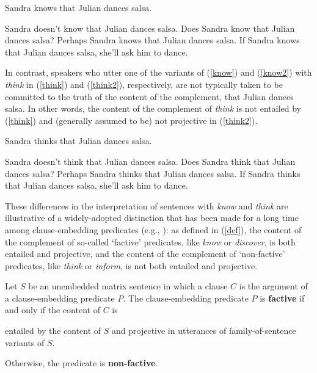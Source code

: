 \documentclass[11pt,fleqn]{article}
\newcommand{\6}{\mbox{$[\hspace*{-.6mm}[$}}
\newcommand{\9}{\mbox{$]\hspace*{-.6mm}]$}}
\begin{document}
\begin{exe}

\ex\label{know} Sandra knows that Julian dances salsa.

\ex\label{know2} 

\begin{xlist} 
\ex Sandra doesn't know that Julian dances salsa. 
\ex Does Sandra know that Julian dances salsa?
\ex Perhaps Sandra knows that Julian dances salsa.
\ex If Sandra knows that Julian dances salsa, she'll ask him to dance. 
\end{xlist}

\end{exe}

In contrast, speakers who utter one of the variants of (\ref{know}) and (\ref{know2}) with {\em think} in (\ref{think}) and (\ref{think2}), respectively, are not typically taken to be committed to the truth of the content of the complement, that Julian dances salsa. In other words, the content of the complement of {\em think} is not entailed by (\ref{think}) and (generally assumed to be) not projective in (\ref{think2}).

\begin{exe}

\ex\label{think} Sandra thinks that Julian dances salsa.
\ex\label{think2} 

\begin{xlist} 
\ex Sandra doesn't think that Julian dances salsa. 
\ex Does Sandra think that Julian dances salsa?
\ex Perhaps Sandra thinks that Julian dances salsa.
\ex If Sandra thinks that Julian dances salsa, she'll ask him to dance. 
\end{xlist}

\end{exe}

These differences in the interpretation of sentences with {\em know} and {\em think} are illustrative of a widely-adopted distinction that has been made for a long time among clause-embedding predicates (e.g., \citealt{karttunen71b,kiparsky-kiparsky71}): as defined in (\ref{def}), the content of the complement of so-called `factive' predicates, like {\em know} or {\em discover}, is both entailed and projective, and the content of the complement of `non-factive' predicates, like {\em think} or {\em inform},  is not both entailed and projective. 

\begin{exe}
\ex\label{def} Let $S$ be an unembedded matrix sentence in which a clause $C$ is the argument of a clause-embedding predicate $P$. The clause-embedding predicate $P$ is {\bf factive} if and only if the content of $C$ is

\begin{xlist}
\ex entailed by the content of $S$ and
\ex projective in utterances of family-of-sentence variants of $S$.
\end{xlist}
Otherwise, the predicate is {\bf non-factive}.
\end{exe}
\end{document}
